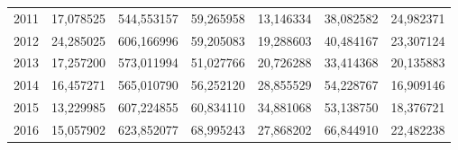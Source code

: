 \begin{table}
\begin{tabular}{p{1cm}p{2cm}p{2cm}p{2cm}p{2cm}p{2cm}p{2cm}}
 2011 &        17,078525 &                544,553157 &                                59,265958 & 13,146334 & 38,082582 &                         24,982371 \\
 2012 &        24,285025 &                606,166996 &                                59,205083 & 19,288603 & 40,484167 &                         23,307124 \\
 2013 &        17,257200 &                573,011994 &                                51,027766 & 20,726288 & 33,414368 &                         20,135883 \\
 2014 &        16,457271 &                565,010790 &                                56,252120 & 28,855529 & 54,228767 &                         16,909146 \\
 2015 &        13,229985 &                607,224855 &                                60,834110 & 34,881068 & 53,138750 &                         18,376721 \\
 2016 &        15,057902 &                623,852077 &                                68,995243 & 27,868202 & 66,844910 &                         22,482238 \\
\bottomrule
\end{tabular}
\end{table}
